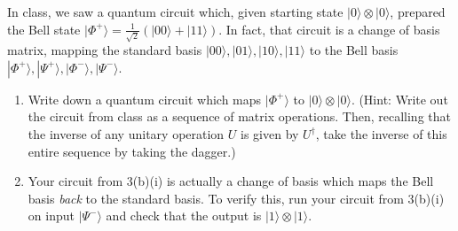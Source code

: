 \documentclass{article}
\newcommand{\ket}[1]{|#1\rangle}
\begin{document}
\begin{enumerate}
\begin{enumerate}
                In class, we saw a quantum circuit which, given starting state $\ket{0}\otimes\ket{0}$, prepared the Bell state $\ket{\Phi^+}=\frac{1}{\sqrt{2}}(\ket{00}+\ket{11})$. In fact, that circuit is a change of basis matrix, mapping the standard basis $\ket{00},\ket{01},\ket{10},\ket{11}$ to the Bell basis $\ket{\Phi^+},\ket{\Psi^+},\ket{\Phi^-},\ket{\Psi^-}$.
                \begin{enumerate}
                    \item %
                    Write down a quantum circuit which maps $\ket{\Phi^+}$ to $\ket{0}\otimes\ket{0}$. (Hint: Write out the circuit from class as a sequence of matrix operations. Then, recalling that the inverse of any unitary operation $U$ is given by $U^\dagger$, take the inverse of this entire sequence by taking the dagger.)
                    \item %
                    Your circuit from 3(b)(i) is actually a change of basis which maps the Bell basis \emph{back} to the standard basis. To verify this, run your circuit from 3(b)(i) on input $\ket{\Psi^-}$ and check that the output is $\ket{1}\otimes\ket{1}$.
                \end{enumerate}
            \end{enumerate}
\end{enumerate}
\end{document}
